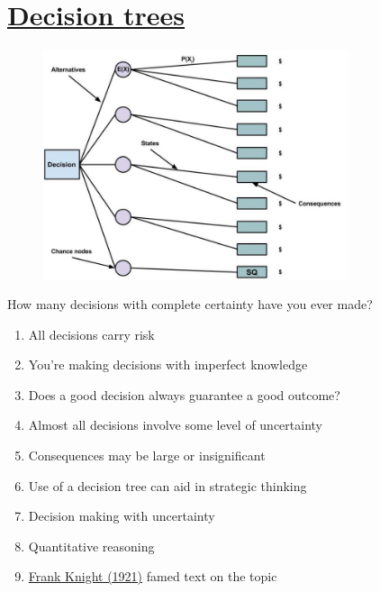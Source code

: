 \documentclass[aspectratio=1610,pdftex,dvipsnames,compress,xcolor={dvipsnames}]{beamer}
\begin{document}
\section{\href{https://uidaho.pressbooks.pub/riskassessment/chapter/decision-trees/}{Decision trees}}


\addtocounter{framenumber}{-1}
\begin{frame}{}
    \begin{figure}
        \centering
        \includegraphics[width=0.80\textwidth]{decision.tree_blank.jpg}
    \end{figure}
\end{frame}


\begin{frame}{How many decisions with complete certainty have you ever made?}
    \begin{enumerate}[series=outerlist,topsep=0pt,itemsep=11pt,leftmargin=*,label=(\arabic*)]
        \item[]All decisions carry risk
        \item[]You're making decisions with imperfect knowledge  
        \item[]Does a good decision always guarantee a good outcome?
        \item[]Almost all decisions involve some level of uncertainty  
        \item[]Consequences may be large or insignificant  
        \item[]Use of a decision tree can aid in strategic thinking
        \item[]Decision making with uncertainty  
        \item[]Quantitative reasoning
        \item[]\href{https://oll.libertyfund.org/title/knight-risk-uncertainty-and-profit}{Frank Knight (1921)} famed text on the topic
    \end{enumerate}
\end{frame}
\end{document}
